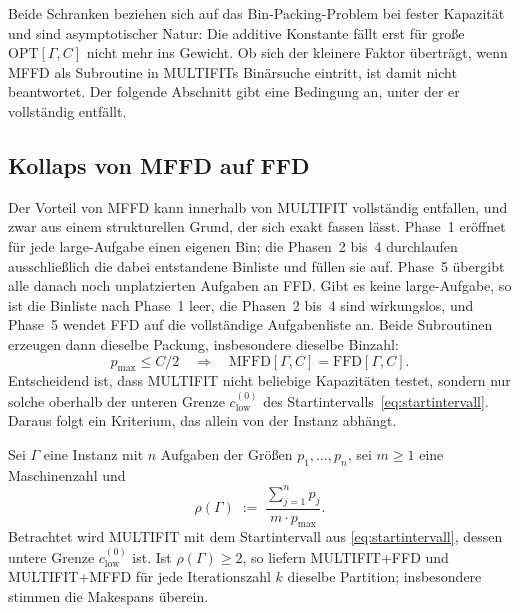 Beide Schranken beziehen sich auf das Bin-Packing-Problem bei fester Kapazität und sind
asymptotischer Natur: Die additive Konstante fällt erst für große $\mathrm{OPT}[\Gamma, C]$ nicht
mehr ins Gewicht.
Ob sich der kleinere Faktor überträgt, wenn MFFD als Subroutine in MULTIFITs Binärsuche eintritt,
ist damit nicht beantwortet.
Der folgende Abschnitt gibt eine Bedingung an, unter der er vollständig entfällt.

\subsection{Kollaps von MFFD auf FFD}
\label{sub:kollaps}

Der Vorteil von MFFD kann innerhalb von MULTIFIT vollständig entfallen, und zwar aus einem
strukturellen Grund, der sich exakt fassen lässt.
Phase~1 eröffnet für jede large-Aufgabe einen eigenen Bin; die Phasen~2 bis~4 durchlaufen ausschließlich die dabei entstandene Binliste und füllen sie auf.
Phase~5 übergibt alle danach noch unplatzierten Aufgaben an FFD.
Gibt es keine large-Aufgabe, so ist die Binliste nach Phase~1 leer, die Phasen~2 bis~4 sind wirkungslos, und Phase~5 wendet FFD auf die vollständige Aufgabenliste an.
Beide Subroutinen erzeugen dann dieselbe Packung, insbesondere dieselbe Binzahl:
\begin{equation}
  p_{\max} \le C/2 \quad\Longrightarrow\quad
  \mathrm{MFFD}[\Gamma, C] = \mathrm{FFD}[\Gamma, C].
  \label{eq:mffd-gleich-ffd}
\end{equation}
Entscheidend ist, dass MULTIFIT nicht beliebige Kapazitäten testet, sondern nur solche oberhalb der unteren Grenze $c_{\mathrm{low}}^{(0)}$ des Startintervalls~\eqref{eq:startintervall}.
Daraus folgt ein Kriterium, das allein von der Instanz abhängt.

\begin{lemma}
\label{lem:kollaps}
Sei $\Gamma$ eine Instanz mit $n$ Aufgaben der Größen $p_1, \ldots, p_n$, sei $m \ge 1$ eine
Maschinenzahl und
\[
  \rho(\Gamma) \;:=\; \frac{\sum_{j=1}^{n} p_j}{m \cdot p_{\max}}.
\]
Betrachtet wird MULTIFIT mit dem Startintervall aus \eqref{eq:startintervall}, dessen untere
Grenze $c_{\mathrm{low}}^{(0)}$ ist.
Ist $\rho(\Gamma) \ge 2$, so liefern MULTIFIT+FFD und MULTIFIT+MFFD für jede Iterationszahl $k$ dieselbe Partition; insbesondere stimmen die Makespans überein.
\end{lemma}

